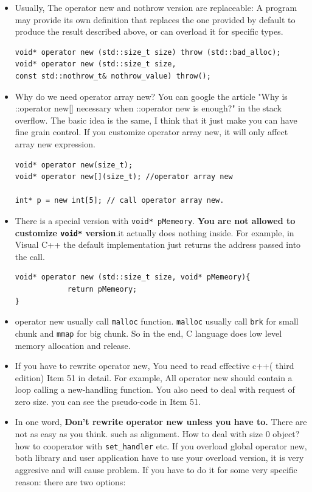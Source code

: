 \documentclass[a4paper,11pt,twoside]{book}
\begin{document}
\begin{itemize}
	\item Usually, The operator new and nothrow version are replaceable: A program may provide its own definition that replaces the one provided by default to produce the result described above, or can overload it for specific types. 
\begin{lstlisting}[numbers=none]
void* operator new (std::size_t size) throw (std::bad_alloc);
void* operator new (std::size_t size, 
const std::nothrow_t& nothrow_value) throw();
\end{lstlisting}

\item Why do we need operator array new? You can google the article "Why is ::operator new[] necessary when ::operator new is enough?" in the stack overflow. The basic idea is the same, I think that it just make you can have fine grain control. If you customize operator array new, it will only affect array new expression.  
\begin{lstlisting}[numbers=none]
void* operator new(size_t);
void* operator new[](size_t); //operator array new

int* p = new int[5]; // call operator array new.
\end{lstlisting}

	\item There is a special version with \texttt{void* pMemeory}. \textbf{You are not allowed to customize \texttt{void*} version}.it actually does nothing inside. For example, in Visual C++ the default implementation just returns the address passed into the call.
\begin{lstlisting}[numbers=none]
void* operator new (std::size_t size, void* pMemeory){
			return pMemeory;
}
\end{lstlisting}

	
	\item operator new usually call \texttt{malloc} function. \texttt{malloc} usually call \texttt{brk} for small chunk and \texttt{mmap} for big chunk. So in the end, C language does low level memory allocation and release.

	
	\item If you have to rewrite operator new, You need to read  effective c++( third edition) Item 51 in detail. For example, All operator new should contain a loop calling a new-handling function.  You also need to deal with request of zero size. you can see the pseudo-code in Item 51.
	
	\item In one word, \textbf{Don't rewrite operator new unless you have to.} There are not as easy as you think. such as alignment. How to deal with size 0 object? how to cooperator with \texttt{set\_handler} etc. If you overload global operator new, both library and user application have to use your overload version, it is very aggresive and will cause problem.  If you have to do it for some very specific reason: there are two options:
	

\end{itemize}
\end{document}
